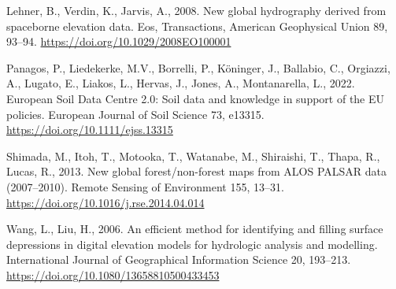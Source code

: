 \documentclass[
]{book}
\newlength{\cslhangindent}
\newenvironment{CSLReferences}[2] %
 {\begin{list}{}{%
  \setlength{\itemindent}{0pt}
  \setlength{\leftmargin}{0pt}
  \setlength{\parsep}{0pt}
  \ifodd #1
   \setlength{\leftmargin}{\cslhangindent}
   \setlength{\itemindent}{-1\cslhangindent}
  \fi
  \setlength{\itemsep}{#2\baselineskip}}}
 {\end{list}}
\begin{document}
\begin{CSLReferences}{1}{0}
Lehner, B., Verdin, K., Jarvis, A., 2008. New global hydrography derived from spaceborne elevation data. Eos, Transactions, American Geophysical Union 89, 93--94. \url{https://doi.org/10.1029/2008EO100001}

Panagos, P., Liedekerke, M.V., Borrelli, P., Köninger, J., Ballabio, C., Orgiazzi, A., Lugato, E., Liakos, L., Hervas, J., Jones, A., Montanarella, L., 2022. {European} {Soil} {Data} {Centre} 2.0: {Soil} data and knowledge in support of the {EU} policies. European Journal of Soil Science 73, e13315. \url{https://doi.org/10.1111/ejss.13315}

Shimada, M., Itoh, T., Motooka, T., Watanabe, M., Shiraishi, T., Thapa, R., Lucas, R., 2013. New global forest/non-forest maps from {ALOS PALSAR} data (2007--2010). Remote Sensing of Environment 155, 13--31. \url{https://doi.org/10.1016/j.rse.2014.04.014}

Wang, L., Liu, H., 2006. An efficient method for identifying and filling surface depressions in digital elevation models for hydrologic analysis and modelling. International Journal of Geographical Information Science 20, 193--213. \url{https://doi.org/10.1080/13658810500433453}

\end{CSLReferences}
\end{document}
